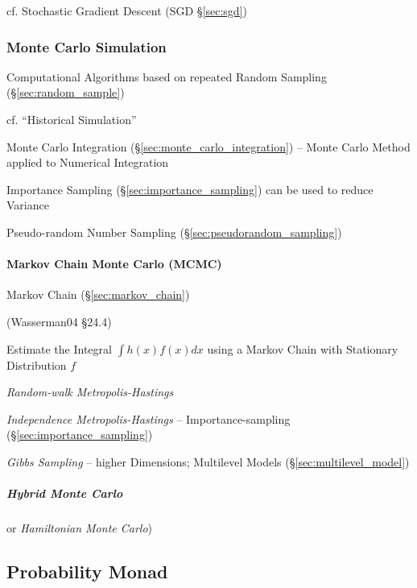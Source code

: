 cf. Stochastic Gradient Descent (SGD \S\ref{sec:sgd})



\subsubsection{Monte Carlo Simulation}\label{sec:monte_carlo}

Computational Algorithms based on repeated Random Sampling
(\S\ref{sec:random_sample})

cf. ``Historical Simulation''

Monte Carlo Integration (\S\ref{sec:monte_carlo_integration}) -- Monte Carlo
Method applied to Numerical Integration

Importance Sampling (\S\ref{sec:importance_sampling}) can be used to reduce
Variance

Pseudo-random Number Sampling (\S\ref{sec:pseudorandom_sampling})



\paragraph{Markov Chain Monte Carlo (MCMC)}\label{sec:mcmc}\hfill

Markov Chain (\S\ref{sec:markov_chain})

(Wasserman04 \S24.4)

Estimate the Integral $\int h(x) f(x) dx$ using a Markov Chain with Stationary
Distribution $f$

\emph{Random-walk Metropolis-Hastings}

\emph{Independence Metropolis-Hastings} -- Importance-sampling
(\S\ref{sec:importance_sampling})

\emph{Gibbs Sampling} -- higher Dimensions; Multilevel Models
(\S\ref{sec:multilevel_model})



\subparagraph{Hybrid Monte Carlo}\label{sec:hybrid_monte_carlo}\hfill

or \emph{Hamiltonian Monte Carlo})



\subsection{Probability Monad}\label{sec:probability_monad}

